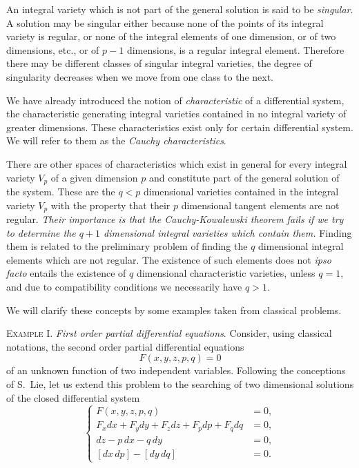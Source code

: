 \documentclass[leqno,11pt]{book}
\numberwithin{equation}{chapter}
\theoremstyle{shape1}
\theoremstyle{shape0}
\theoremstyle{shape2}
\theoremstyle{definition}
\begin{document}
An integral variety which is not part of the general solution is said to be \emph{singular}. A solution may be singular either because none of the points of its integral variety is regular, or none of the integral elements of one dimension, or of two dimensions, {etc.}, or of $p-1$ dimensions, is a regular integral element. Therefore there may be different classes of singular integral varieties, the degree of singularity decreases when we move from one class to the next.



\vspace{12pt}\fsec We have already introduced the notion of \emph{characteristic} of a differential system, the characteristic generating integral varieties contained in no integral variety of greater dimensions. These characteristics exist only for certain differential system. We will refer to them as the \emph{Cauchy characteristics}.

There are other spaces of characteristics which exist in general for every integral variety $V_{p}$ of a given dimension $p$ and constitute part of the general solution of the system. These are the $q<p$ dimensional varieties contained in the integral variety $V_{p}$ with the property that their $p$ dimensional tangent elements are not regular.  \emph{Their importance is that the Cauchy-Kowalewski theorem fails if we try to determine the $q+1$ dimensional integral varieties which contain them.} Finding them is related to the preliminary problem of finding the $q$ dimensional integral elements which are not regular. The existence of such elements does not \emph{ipso facto} entails the existence of $q$ dimensional characteristic varieties, unless $q=1$, and due to compatibility conditions we necessarily have $q>1$.

We will clarify these concepts by some examples taken from classical problems.



\vspace{12pt}\fsec \textsc{Example I.} \emph{First order partial differential equations}. Consider, using classical notations, the second order partial differential equations
\[
F(x,y,z,p,q)=0
\]
of an unknown function of two independent variables. Following the conceptions of S.~Lie, let us extend this problem to the searching of two dimensional solutions of the closed differential system
\begin{equation}
  \label{eq:4.13}
  \left\{
    \begin{aligned}
      F(x,y,z,p,q)&=0,\\
      F_{x}dx+F_{y}dy+F_{z}dz+F_{p}dp+F_{q}dq&=0,\\
      dz-p\,dx-q\,dy&=0,\\
      [dx\,dp]-[dy\,dq]&=0.
    \end{aligned}
\right.
\end{equation}
\end{document}
